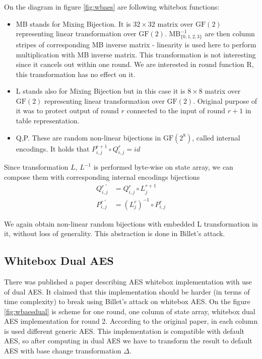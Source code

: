 \documentclass[11pt,oneside,final]{fithesis2}
\begin{document}
	On the diagram in figure \ref{fig:wbaes} are following whitebox functions:
	\begin{itemize}
	\item MB stands for Mixing Bijection. It is $32 \times 32$ matrix over $\text{GF}(2)$ representing linear transformation over $\text{GF}(2)$. 
	$\text{MB}^{-1}_{\{0,1,2,3\}}$ are then column stripes of corresponding MB inverse matrix - linearity is used here to perform multiplication with MB inverse matrix.
	This transformation is not interesting since it cancels out within one round. We are interested in round function R, this transformation has no effect on it.
	\item L stands also for Mixing Bijection but in this case it is $8 \times 8$ matrix over $\text{GF}(2)$ representing linear transformation over $\text{GF}(2)$. 
	Original purpose of it was to protect output of round $r$ connected to the input of round $r+1$ in table representation. 
	\item Q,P. These are random non-linear bijections in $\text{GF}(2^8)$, called internal encodings. It holds that $P^{r+1}_{i,j} \circ Q^{r}_{i,j} = id$
	\end{itemize}

	Since transformation $L$, $L^{-1}$ is performed byte-wise on state array, we can compose them with corresponding internal encodings bijections
	\begin{align}
	    Q^{r \; \prime}_{i,j} &= Q^{r}_{i,j} \circ L^{r+1}_{j} \label{eq:ioencoding_abstract_q}\\
	    P^{r \; \prime}_{i,j} &= (L^{r}_{j})^{-1} \circ P^{r}_{i,j} \label{eq:ioencoding_abstract_p}
	\end{align}

	We again obtain non-linear random bijections with embedded L transformation in it, without loss of generality. This abstraction is done in Billet's attack.

	\newpage


	\subsection{Whitebox Dual AES}
	There was published a paper describing AES whitebox implementation with use of dual AES. It claimed that this implementation should be harder (in terms of time complexity)
	to break using Billet's attack on whitebox AES. On the figure \ref{fig:wbaesdual} is scheme for one round, one column of state array, whitebox dual AES implementation for round 2.
	According to the original paper, in each
	column is used different generic AES. This implementation is compatible with default AES, so after computing in dual AES we have to transform the result to default AES
	with base change transformation $\Delta$.\\
\end{document}
